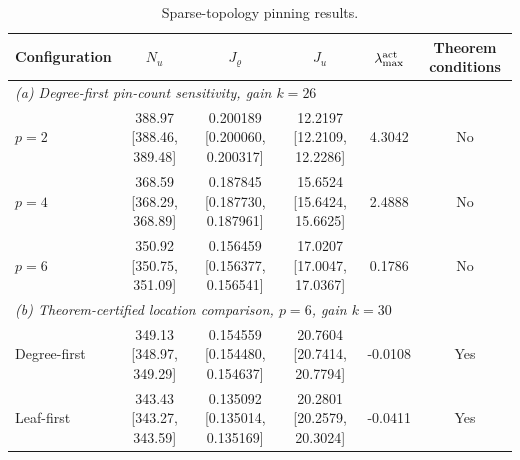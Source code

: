 \begin{table}[t]
\centering
\scriptsize
\caption{Sparse-topology pinning results.}
\label{tab:r4_sparse_pinning}
\renewcommand{\arraystretch}{1.15}
\begin{tabular}{lccccc}
\toprule
Configuration & $N_u$ & $J_\varrho$ & $J_u$ & $\lambda_{\max}^{\rm act}$ & Theorem conditions \\
\midrule
\multicolumn{6}{l}{\textit{(a) Degree-first pin-count sensitivity, gain $k=26$}}\\
$p=2$ & 388.97 [388.46, 389.48] & 0.200189 [0.200060, 0.200317] & 12.2197 [12.2109, 12.2286] & 4.3042 & No \\
$p=4$ & 368.59 [368.29, 368.89] & 0.187845 [0.187730, 0.187961] & 15.6524 [15.6424, 15.6625] & 2.4888 & No \\
$p=6$ & 350.92 [350.75, 351.09] & 0.156459 [0.156377, 0.156541] & 17.0207 [17.0047, 17.0367] & 0.1786 & No \\
\midrule
\multicolumn{6}{l}{\textit{(b) Theorem-certified location comparison, $p=6$, gain $k=30$}}\\
Degree-first & 349.13 [348.97, 349.29] & 0.154559 [0.154480, 0.154637] & 20.7604 [20.7414, 20.7794] & -0.0108 & Yes \\
Leaf-first & 343.43 [343.27, 343.59] & 0.135092 [0.135014, 0.135169] & 20.2801 [20.2579, 20.3024] & -0.0411 & Yes \\
\bottomrule
\end{tabular}
\end{table}
